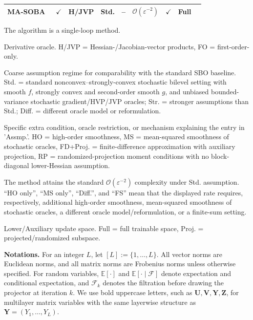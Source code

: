 \documentclass{pkumelon}
\theoremstyle{plain}
\newcommand{\E}{\mathbb{E}}
\begin{document}
\begin{table}[t!]
\begin{threeparttable}
\begin{tabular}{lcccccccc}
\midrule
MA-SOBA~\citep{chen2024optimal}
& $\checkmark$
& H/JVP
& Std.
& --
& $\mathcal O(\varepsilon^{-2})$
& $\checkmark$
& Full\\

\bottomrule
\end{tabular}
\footnotesize
\begin{tablenotes}
\footnotesize
\item[$^\dagger$]The algorithm is a single-loop method.
\item[$^\ddagger$]Derivative oracle. H/JVP = Hessian-/Jacobian-vector products, FO = first-order-only.
\item[$^\triangleright$]Coarse assumption regime for comparability with the standard SBO baseline. Std. = standard nonconvex--strongly-convex stochastic bilevel setting with smooth $f$, strongly convex and second-order smooth $g$, and unbiased bounded-variance stochastic gradient/HVP/JVP oracles; Str. = stronger assumptions than Std.; Diff. = different oracle model or reformulation.
\item[$^\triangleleft$]Specific extra condition, oracle restriction, or mechanism explaining the entry in 'Assmp.'. HO = high-order smoothness, MS = mean-squared smoothness of stochastic oracles, FD+Proj. = finite-difference approximation with auxiliary projection, RP = randomized-projection moment conditions with no block-diagonal lower-Hessian assumption.
\item[$^\blacklozenge$]The method attains the standard $\mathcal O(\varepsilon^{-2})$ complexity under Std. assumption. ``HO only'', ``MS only'', ``Diff.'', and ``FS'' mean that the displayed rate requires, respectively, 
additional high-order smoothness, mean-squared smoothness of stochastic oracles, a different oracle model/reformulation, or a finite-sum setting.
\item[$^\heartsuit$] Lower/Auxiliary update space. Full = full trainable space, Proj. = projected/randomized subspace. 
\end{tablenotes}
\end{threeparttable}
\end{table}

\textbf{Notations. } For an integer $L$, let $[L]:=\{1,\ldots,L\}$. All vector norms are Euclidean norms, and all matrix norms are Frobenius norms unless otherwise specified. For random variables, $\E[\cdot]$ and $\E[\cdot\mid\mathcal F]$ denote expectation and conditional expectation, and $\mathcal F_k$ denotes the filtration before drawing the projector at iteration $k$. We use bold uppercase letters, such as $\boldsymbol U,\boldsymbol V,\boldsymbol Y,\boldsymbol Z$, for multilayer matrix variables with the same layerwise structure as $\boldsymbol Y=(Y_1,\ldots,Y_L)$.
\end{document}
